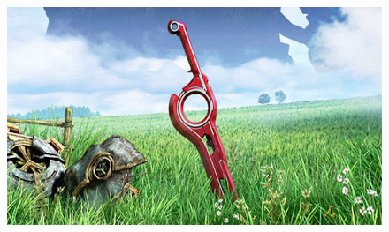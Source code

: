 \documentclass[
11pt, %
spanish, %
singlespacing, %
headsepline, %
]{MastersDoctoralThesis} %
\begin{document}
\Huge \chapter{}\label{Anx:ublox}
\vspace*{\fill}
\begin{figure}[H]
\centering
\includegraphics[scale=0.5]{Figures/null}
\end{figure}
\vfill


\normalsize
 
\end{document}

